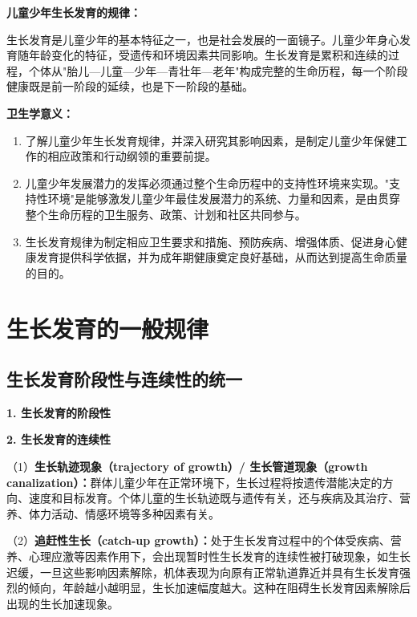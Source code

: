 \begin{keybox}
\textbf{儿童少年生长发育的规律：}

生长发育是儿童少年的基本特征之一，也是社会发展的一面镜子。儿童少年身心发育随年龄变化的特征，受遗传和环境因素共同影响。生长发育是累积和连续的过程，个体从"胎儿—儿童—少年—青壮年—老年"构成完整的生命历程，每一个阶段健康既是前一阶段的延续，也是下一阶段的基础。

\textbf{卫生学意义：}

\begin{enumerate}[leftmargin=*]
    \item 了解儿童少年生长发育规律，并深入研究其影响因素，是制定儿童少年保健工作的相应政策和行动纲领的重要前提。
    \item 儿童少年发展潜力的发挥必须通过整个生命历程中的支持性环境来实现。"支持性环境"是能够激发儿童少年最佳发展潜力的系统、力量和因素，是由贯穿整个生命历程的卫生服务、政策、计划和社区共同参与。
    \item 生长发育规律为制定相应卫生要求和措施、预防疾病、增强体质、促进身心健康发育提供科学依据，并为成年期健康奠定良好基础，从而达到提高生命质量的目的。
\end{enumerate}
\end{keybox}

\section{生长发育的一般规律}

\subsection{生长发育阶段性与连续性的统一}

\begin{defbox}
\textbf{1. 生长发育的阶段性}

\textbf{2. 生长发育的连续性}

（1）\textbf{生长轨迹现象（trajectory of growth）/ 生长管道现象（growth canalization）：}群体儿童少年在正常环境下，生长过程将按遗传潜能决定的方向、速度和目标发育。个体儿童的生长轨迹既与遗传有关，还与疾病及其治疗、营养、体力活动、情感环境等多种因素有关。

（2）\textbf{追赶性生长（catch-up growth）：}处于生长发育过程中的个体受疾病、营养、心理应激等因素作用下，会出现暂时性生长发育的连续性被打破现象，如生长迟缓，一旦这些影响因素解除，机体表现为向原有正常轨道靠近并具有生长发育强烈的倾向，年龄越小越明显，生长加速幅度越大。这种在阻碍生长发育因素解除后出现的生长加速现象。
\end{defbox}

